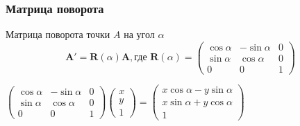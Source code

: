 \documentclass[10pt]{beamer}
\begin{document}
\begin{frame}\frametitle{Матрица поворота}
	
	\begin{block}{Матрица поворота точки $A$ на угол $\alpha$}
		$$
		\textbf{A}' =\textbf{R}(\alpha) \textbf{A}, \text{где } \textbf{R}(\alpha) =
		\begin{pmatrix}
			\cos\alpha&-\sin\alpha&0\\
			\sin\alpha&\cos\alpha&0\\
			0&0&1
		\end{pmatrix} 
		$$
	\end{block}
	
	$
		\begin{pmatrix}
			\cos\alpha&-\sin\alpha&0\\
			\sin\alpha&\cos\alpha&0\\
			0&0&1
		\end{pmatrix} 
		\begin{pmatrix}
			x\\
			y\\
			1
		\end{pmatrix}
		=
		\begin{pmatrix}
			x\cos\alpha - y\sin\alpha\\
			x\sin\alpha + y\cos\alpha\\
			1
		\end{pmatrix}
	$
	
\end{frame}
\end{document}

